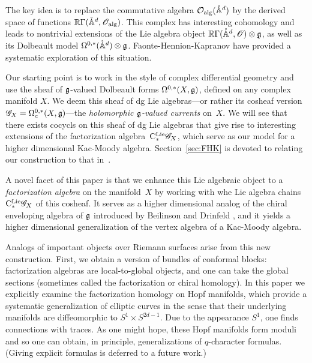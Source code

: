 The key idea is to replace the commutative algebra $\mathcal O_{\rm alg}(\mathring{\mathbb A}^{d})$ by the derived space of functions $\mathbb R \Gamma(\mathring{\mathbb A}^{d}, \mathscr O_{\rm alg})$. 
This complex has interesting cohomology and leads to nontrivial extensions of the Lie algebra object $\mathbb R \Gamma(\mathring{\mathbb A}^{d}, \mathscr O) \otimes \mathfrak g$, as well as its Dolbeault model $\Omega^{0,*}(\mathring{\mathbb A}^d) \otimes \mathfrak g$.
Faonte-Hennion-Kapranov \cite{FHK} have provided a systematic exploration of this situation.

Our starting point is to work in the style of complex differential geometry and use the sheaf of $\mathfrak g$-valued Dolbeault forms $\Omega^{0,*}(X, \mathfrak g)$, defined on any complex manifold $X$. 
We deem this sheaf of dg Lie algebras---or rather its cosheaf version $\mathscr G_X = \Omega^{0,*}_c(X, \mathfrak g)$---the {\em holomorphic $\mathfrak g$-valued currents} on~$X$. 
We will see that there exists cocycls on this sheaf of dg Lie algebras that give rise to interesting extensions of the factorization algebra~${\rm C}^{\rm Lie}_*\mathscr G_X$,
which serve as our model for a higher dimensional Kac-Moody algebra. 
Section~\ref{sec:FHK} is devoted to relating our construction to that in~\cite{FHK}.

A novel facet of this paper is that we enhance this Lie algebraic object to a {\em factorization algebra} on the manifold~$X$
by working with whe Lie algebra chains ${\rm C}^{\rm Lie}_*\mathscr G_X$ of this cosheaf.
It serves as a higher dimensional analog of the chiral enveloping algebra of $\mathfrak g$ introduced by Beilinson and Drinfeld \cite{BD}, 
and it yields a higher dimensional generalization of the vertex algebra of a Kac-Moody algebra. 

Analogs of important objects over Riemann surfaces arise from this new construction.
First, we obtain a version of bundles of conformal blocks:
factorization algebras are local-to-global objects, and one can take the global sections
(sometimes called the factorization or chiral homology).
In this paper we explicitly examine the factorization homology on Hopf manifolds,
which provide a systematic generalization of elliptic curves 
in the sense that their underlying manifolds are diffeomorphic to $S^1 \times S^{2d-1}$.
Due to the appearance $S^1$, one finds connections with traces.
As one might hope, these Hopf manifolds form moduli and so one can obtain, in principle, generalizations of $q$-character formulas.
(Giving explicit formulas is deferred to a future work.)


